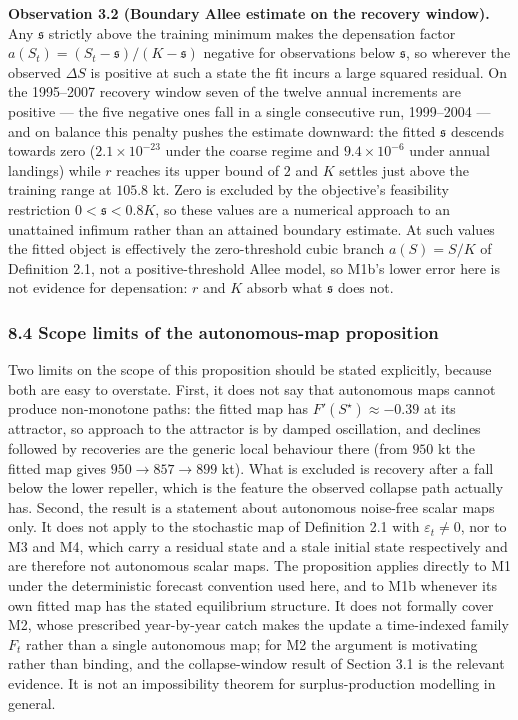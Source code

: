 \documentclass[11pt]{article}
\begin{document}
\textbf{Observation 3.2 (Boundary Allee estimate on the recovery
window).} Any \(\mathfrak s\) strictly above the training minimum makes
the depensation factor \(a(S_t)=(S_t-\mathfrak s)/(K-\mathfrak s)\)
negative for observations below \(\mathfrak s\), so wherever the
observed \(\Delta S\) is positive at such a state the fit incurs a large
squared residual. On the 1995--2007 recovery window seven of the twelve
annual increments are positive --- the five negative ones fall in a
single consecutive run, 1999--2004 --- and on balance this penalty
pushes the estimate downward: the fitted \(\mathfrak s\) descends
towards zero (\(2.1\times10^{-23}\) under the coarse regime and
\(9.4\times10^{-6}\) under annual landings) while \(r\) reaches its
upper bound of \(2\) and \(K\) settles just above the training range at
\(105.8\) kt. Zero is excluded by the objective's feasibility
restriction \(0 < \mathfrak s < 0.8K\), so these values are a numerical
approach to an unattained infimum rather than an attained boundary
estimate. At such values the fitted object is effectively the
zero-threshold cubic branch \(a(S)=S/K\) of Definition 2.1, not a
positive-threshold Allee model, so M1b's lower error here is not
evidence for depensation: \(r\) and \(K\) absorb what \(\mathfrak s\)
does not.

\subsubsection{8.4 Scope limits of the autonomous-map
proposition}\label{scope-limits-of-the-autonomous-map-proposition}

Two limits on the scope of this proposition should be stated explicitly,
because both are easy to overstate. First, it does not say that
autonomous maps cannot produce non-monotone paths: the fitted map has
\(F'(S^\star) \approx -0.39\) at its attractor, so approach to the
attractor is by damped oscillation, and declines followed by recoveries
are the generic local behaviour there (from \(950\) kt the fitted map
gives \(950 \to 857 \to 899\) kt). What is excluded is recovery after a
fall below the lower repeller, which is the feature the observed
collapse path actually has. Second, the result is a statement about
autonomous noise-free scalar maps only. It does not apply to the
stochastic map of Definition 2.1 with \(\varepsilon_t \neq 0\), nor to
M3 and M4, which carry a residual state and a stale initial state
respectively and are therefore not autonomous scalar maps. The
proposition applies directly to M1 under the deterministic forecast
convention used here, and to M1b whenever its own fitted map has the
stated equilibrium structure. It does not formally cover M2, whose
prescribed year-by-year catch makes the update a time-indexed family
\(F_t\) rather than a single autonomous map; for M2 the argument is
motivating rather than binding, and the collapse-window result of
Section 3.1 is the relevant evidence. It is not an impossibility theorem
for surplus-production modelling in general.
\end{document}
